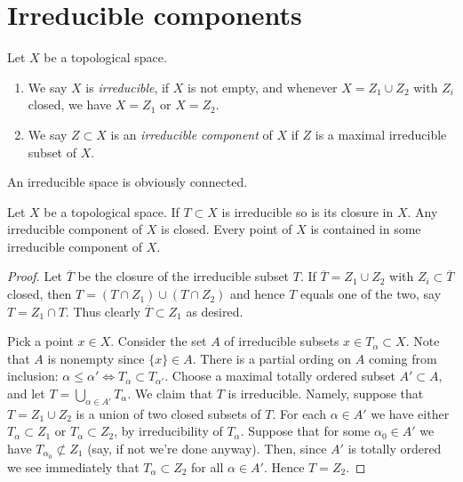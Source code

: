 \section{Irreducible components}
\label{section-irreducible-components}

\begin{definition}
\label{definition-irreducible-components}
Let $X$ be a topological space.
\begin{enumerate}
\item We say $X$ is {\it irreducible}, if $X$ is not empty, and whenever
$X = Z_1 \cup Z_2$ with $Z_i$ closed, we have $X = Z_1$ or $X = Z_2$.
\item We say $Z \subset X$ is an {\it irreducible component} of $X$
if $Z$ is a maximal irreducible subset of $X$.
\end{enumerate}
\end{definition}

\noindent
An irreducible space is obviously connected.

\begin{lemma}
\label{lemma-irreducible}
Let $X$ be a topological space. If $T \subset X$ is irreducible
so is its closure in $X$. Any irreducible component of $X$ is
closed. Every point of $X$ is contained in some irreducible component
of $X$.
\end{lemma}

\begin{proof}
Let $\overline{T}$ be the closure of the irreducible subset $T$.
If $\overline{T} = Z_1 \cup Z_2$ with $Z_i \subset \overline{T}$
closed, then $T = (T\cap Z_1) \cup (T \cap Z_2)$ and hence 
$T$ equals one of the two, say $T = Z_1 \cap T$. Thus clearly
$\overline{T} \subset Z_1$ as desired.

\medskip\noindent
Pick a point $x\in X$. Consider the set $A$ of irreducible subsets
$x \in T_\alpha \subset X$. Note that $A$ is nonempty since
$\{x\} \in A$. There is a partial ording on $A$ coming from
inclusion: $\alpha \leq \alpha' \Leftrightarrow T_\alpha \subset T_{\alpha'}$.
Choose a maximal totally ordered subset $A' \subset A$, and let
$T = \bigcup_{\alpha \in A'} T_\alpha$. We claim that $T$ is 
irreducible. Namely, suppose that $T =  Z_1 \cup Z_2$ is a union
of two closed subsets of $T$. For each $\alpha \in A'$ we have
either $T_\alpha \subset Z_1$ or $T_\alpha \subset Z_2$, by irreducibility
of $T_\alpha$. Suppose that for some $\alpha_0 \in A'$ we have
$T_{\alpha_0} \not\subset Z_1$ (say, if not we're done anyway).
Then, since $A'$ is totally ordered we see immediately that
$T_\alpha \subset Z_2$ for all $\alpha \in A'$. Hence $T = Z_2$. 
\end{proof}

